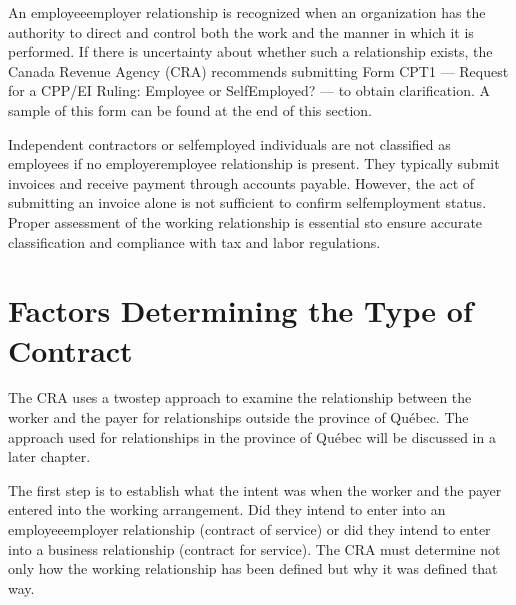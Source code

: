 \documentclass[letterpaper,10pt,english]{sphinxmanual}
\begin{document}
\sphinxAtStartPar
An employee\sphinxhyphen{}employer relationship is recognized when an organization has the authority to direct and control both the work and
the manner in which it is performed. If there is uncertainty about whether such a relationship exists, the Canada Revenue
Agency (CRA) recommends submitting Form CPT1 — Request for a CPP/EI Ruling: Employee or Self\sphinxhyphen{}Employed? — to obtain
clarification. A sample of this form can be found at the end of this section.

\sphinxAtStartPar
Independent contractors or self\sphinxhyphen{}employed individuals are not classified as employees if no employer\sphinxhyphen{}employee relationship is
present. They typically submit invoices and receive payment through accounts payable. However, the act of submitting an
invoice alone is not sufficient to confirm self\sphinxhyphen{}employment status. Proper assessment of the working relationship is essential
sto ensure accurate classification and compliance with tax and labor regulations.


\section{Factors Determining the Type of Contract}
\label{\detokenize{3_contracts:factors-determining-the-type-of-contract}}
\sphinxAtStartPar
The CRA uses a two\sphinxhyphen{}step approach to examine the relationship between the worker and the
payer for relationships outside the province of Québec. The approach used for relationships
in the province of Québec will be discussed in a later chapter.

\sphinxAtStartPar
{}
The first step is to establish what the intent was when the worker and the payer entered into
the working arrangement. Did they intend to enter into an employee\sphinxhyphen{}employer relationship
(contract of service) or did they intend to enter into a business relationship (contract for
service). The CRA must determine not only how the working relationship has been defined
but why it was defined that way.
\end{document}
